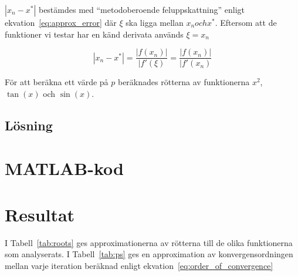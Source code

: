 \documentclass[a4paper,titlepage]{article}
\begin{document}
$|x_n - x^*|$ bestämdes med ``metodoberoende feluppskattning'' enligt 
ekvation~\ref{eq:approx_error} där $\xi$ ska ligga mellan $x_n och x^*$. Eftersom
att de funktioner vi testar har en känd derivata används $\xi = x_n$

\begin{equation}
    |x_n - x^*| = \frac{|f(x_n)|}{|f'(\xi)} = \frac{|f(x_n)|}{|f'(x_n)}
    \label{eq:approx_error}
\end{equation}


För att beräkna ett värde på $p$ beräknades rötterna av funktionerna $x^2$, $\tan(x)$
och $\sin(x)$.



\subsection{Lösning}


\section{MATLAB-kod}



\section{Resultat}

I Tabell~\ref{tab:roots} ges approximationerna av rötterna till de olika
funktionerna som analyserats. I Tabell~\ref{tab:ps} ges en approximation av 
konvergensordningen mellan varje iteration beräknad enligt ekvation~\ref{eq:order_of_convergence}
\end{document}
